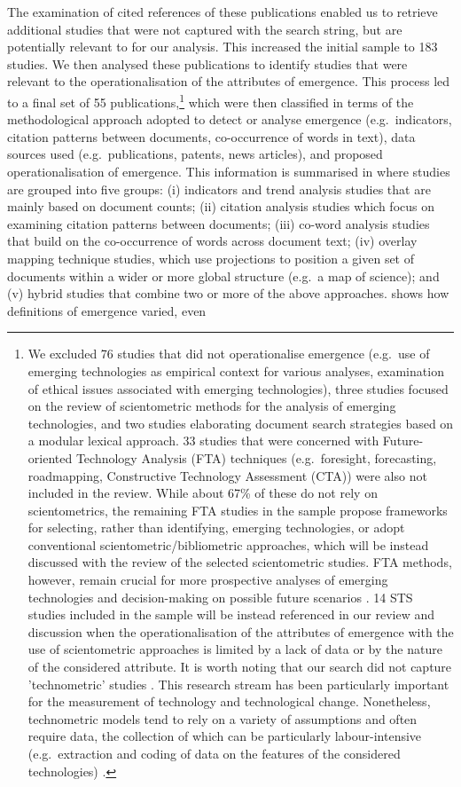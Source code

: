 \documentclass[11pt]{article}
\begin{document}
The examination of cited references of these publications enabled us to retrieve additional studies that were not captured with the search string, but are potentially relevant to for our analysis. This increased the initial sample to 183 studies. We then analysed these publications to identify studies that were relevant to the operationalisation of the attributes of emergence. This process led to a final set of 55 publications,\footnote{We excluded 76 studies that did not operationalise emergence (e.g.\ use of emerging technologies as empirical context for various analyses, examination of ethical issues associated with emerging technologies), three studies focused on the review of scientometric methods for the analysis of emerging technologies, and two studies elaborating document search strategies based on a modular lexical approach. 33 studies that were concerned with Future-oriented Technology Analysis (FTA) techniques (e.g.\ foresight, forecasting, roadmapping, Constructive Technology Assessment (CTA)) were also not included in the review. While about 67\% of these do not rely on scientometrics, the remaining FTA studies in the sample propose frameworks for selecting, rather than identifying, emerging technologies, or adopt conventional scientometric/bibliometric approaches, which will be instead discussed with the review of the selected scientometric studies. FTA methods, however, remain crucial for more prospective analyses of emerging technologies and decision-making on possible future scenarios \citep[e.g.][]{Porter2004, Irvine1984, Ciarli2013}. 14 STS studies included in the sample will be instead referenced in our review and discussion when the operationalisation of the attributes of emergence with the use of scientometric approaches is limited by a lack of data or by the nature of the considered attribute. It is worth noting that our search did not capture 'technometric' studies \citep[e.g.][]{Grupp1994,Saviotti1984,Sahal1985}. This research stream has been particularly important for the measurement of technology and technological change. Nonetheless, technometric models tend to rely on a variety of assumptions and often require data, the collection of which can be particularly labour-intensive (e.g.\ extraction and coding of data on the features of the considered technologies) \citep[e.g.][]{Coccia2005}.} which were then classified in terms of the methodological approach adopted to detect or analyse emergence (e.g.\ indicators, citation patterns between documents, co-occurrence of words in text), data sources used (e.g.\ publications, patents, news articles), and proposed operationalisation of emergence. This information is summarised in  where studies are grouped into five groups: (i) indicators and trend analysis studies that are mainly based on document counts; (ii) citation analysis studies which focus on examining citation patterns between documents; (iii) co-word analysis studies that build on the co-occurrence of words across document text; (iv) overlay mapping technique studies, which use projections to position a given set of documents within a wider or more global structure (e.g.\ a map of science); and (v) hybrid studies that combine two or more of the above approaches.  shows how definitions of emergence varied, even 
\end{document}
